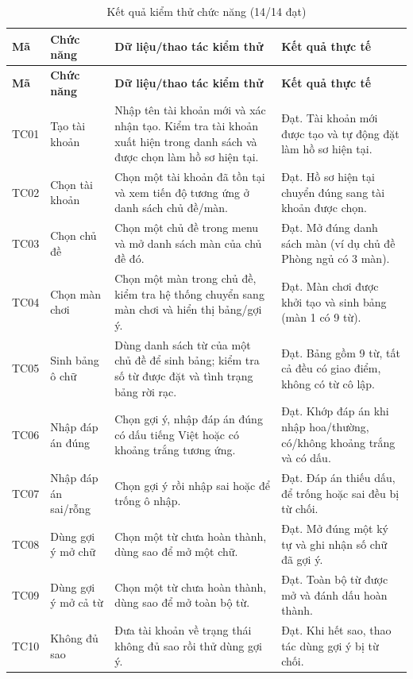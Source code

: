 \documentclass[../DoAn.tex]{subfiles}
\begin{document}
\begin{longtable}{|>{\RaggedRight\arraybackslash}p{1.5cm}|>{\RaggedRight\arraybackslash}p{3.0cm}|>{\RaggedRight\arraybackslash}p{4.5cm}|>{\RaggedRight\arraybackslash}p{4.0cm}|}
\caption{Kết quả kiểm thử chức năng (14/14 đạt)}
\label{table:test_cases}\\
\hline
\textbf{Mã} & \textbf{Chức năng} & \textbf{Dữ liệu/thao tác kiểm thử} & \textbf{Kết quả thực tế} \\ \hline
\endfirsthead
\hline
\textbf{Mã} & \textbf{Chức năng} & \textbf{Dữ liệu/thao tác kiểm thử} & \textbf{Kết quả thực tế} \\ \hline
\endhead
TC01 & Tạo tài khoản & Nhập tên tài khoản mới và xác nhận tạo. Kiểm tra tài khoản xuất hiện trong danh sách và được chọn làm hồ sơ hiện tại. & Đạt. Tài khoản mới được tạo và tự động đặt làm hồ sơ hiện tại. \\ \hline
TC02 & Chọn tài khoản & Chọn một tài khoản đã tồn tại và xem tiến độ tương ứng ở danh sách chủ đề/màn. & Đạt. Hồ sơ hiện tại chuyển đúng sang tài khoản được chọn. \\ \hline
TC03 & Chọn chủ đề & Chọn một chủ đề trong menu và mở danh sách màn của chủ đề đó. & Đạt. Mở đúng danh sách màn (ví dụ chủ đề Phòng ngủ có 3 màn). \\ \hline
TC04 & Chọn màn chơi & Chọn một màn trong chủ đề, kiểm tra hệ thống chuyển sang màn chơi và hiển thị bảng/gợi ý. & Đạt. Màn chơi được khởi tạo và sinh bảng (màn 1 có 9 từ). \\ \hline
TC05 & Sinh bảng ô chữ & Dùng danh sách từ của một chủ đề để sinh bảng; kiểm tra số từ được đặt và tình trạng bảng rời rạc. & Đạt. Bảng gồm 9 từ, tất cả đều có giao điểm, không có từ cô lập. \\ \hline
TC06 & Nhập đáp án đúng & Chọn gợi ý, nhập đáp án đúng có dấu tiếng Việt hoặc có khoảng trắng tương ứng. & Đạt. Khớp đáp án khi nhập hoa/thường, có/không khoảng trắng và có dấu. \\ \hline
TC07 & Nhập đáp án sai/rỗng & Chọn gợi ý rồi nhập sai hoặc để trống ô nhập. & Đạt. Đáp án thiếu dấu, để trống hoặc sai đều bị từ chối. \\ \hline
TC08 & Dùng gợi ý mở chữ & Chọn một từ chưa hoàn thành, dùng sao để mở một chữ. & Đạt. Mở đúng một ký tự và ghi nhận số chữ đã gợi ý. \\ \hline
TC09 & Dùng gợi ý mở cả từ & Chọn một từ chưa hoàn thành, dùng sao để mở toàn bộ từ. & Đạt. Toàn bộ từ được mở và đánh dấu hoàn thành. \\ \hline
TC10 & Không đủ sao & Đưa tài khoản về trạng thái không đủ sao rồi thử dùng gợi ý. & Đạt. Khi hết sao, thao tác dùng gợi ý bị từ chối. \\ \hline

\end{longtable}
\end{document}
